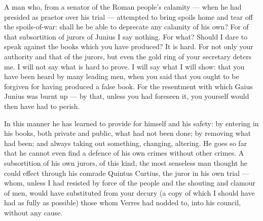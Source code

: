  A man who, from a senator of the Roman people's calamity --- when he had presided as praetor over his trial --- attempted to bring spoils home and tear off the spoils-of-war: shall he be able to deprecate any calamity of his own? For of that subsortition of jurors of Junius I say nothing. For what? Should I dare to speak against the books which you have produced? It is hard. For not only your authority and that of the jurors, but even the gold ring of your secretary deters me. I will not say what is hard to prove. I will say what I will show: that you have been heard by many leading men, when you said that you ought to be forgiven for having produced a false book. For the resentment with which Gaius Junius was burnt up --- by that, unless you had foreseen it, you yourself would then have had to perish.

 In this manner he has learned to provide for himself and his safety: by entering in his books, both private and public, what had not been done; by removing what had been; and always taking out something, changing, altering. He goes so far that he cannot even find a defence of his own crimes without other crimes. A subsortition of his own jurors, of this kind, the most senseless man thought he could effect through his comrade Quintus Curtius, the juror in his own trial --- whom, unless I had resisted by force of the people and the shouting and clamour of men, would have substituted from your decury (a copy of which I should have had as fully as possible) those whom Verres had nodded to, into his council, without any cause.




